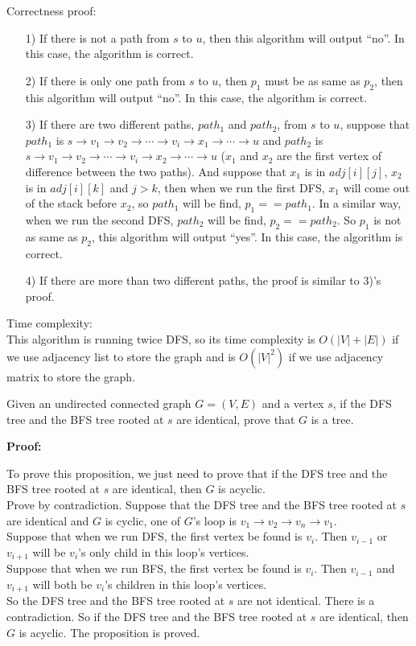 \documentclass{oxmathproblems}
\begin{document}
\begin{questions}
Correctness proof:
\begin{itemize}
	\item [1)] 
	If there is not a path from $s$ to $u$, then this algorithm will output ``no''. In this case, the algorithm is correct.
	\item [2)]
	If there is only one path from $s$ to $u$, then $p_1$ must be as same as $p_2$, then this algorithm will output ``no''. In this case, the algorithm is correct.
	\item [3)]
	If there are two different paths, $path_1$ and $path_2$, from $s$ to $u$, suppose that $path_1$ is $s\rightarrow v_1\rightarrow v_2\rightarrow \cdots \rightarrow v_i\rightarrow x_1\rightarrow \cdots \rightarrow u$ and $path_2$ is $s\rightarrow v_1\rightarrow v_2\rightarrow \cdots \rightarrow v_i\rightarrow x_2\rightarrow \cdots \rightarrow u$ ($x_1$ and $x_2$ are the first vertex of difference between the two paths). And suppose that $x_1$ is in $adj[i][j]$, $x_2$ is in $adj[i][k]$ and $j > k$, then when we run the first DFS, $x_1$ will come out of the stack before $x_2$, so $path_1$ will be find, $p_1 == path_1$. In a similar way, when we run the second DFS, $path_2$ will be find, $p_2 == path_2$. So $p_1$ is not as same as $p_2$, this algorithm will output ``yes''. In this case, the algorithm is correct.
	\item[4)]
	If there are more than two different paths, the proof is similar to 3)'s proof.
\end{itemize}
Time complexity:\\
This algorithm is running twice DFS, so its time complexity is $O(|V|+|E|)$ if we use adjacency list to store the graph and is $O(|V|^2)$ if we use adjacency matrix to store the graph.

\miquestion[25]
Given an undirected connected graph $G=(V,E)$ and a vertex $s$, if the DFS tree and the BFS tree rooted at $s$ are identical, prove that $G$ is a tree.

\textbf{Proof:}

To prove this proposition, we just need to prove that if the DFS tree and the BFS tree rooted at $s$ are identical, then $G$ is acyclic.\\
Prove by contradiction. Suppose that the DFS tree and the BFS tree rooted at $s$ are identical and $G$ is cyclic, one of $G$'s loop is $v_1\rightarrow v_2\rightarrow v_n\rightarrow v_1$.\\
Suppose that when we run DFS, the first vertex be found is $v_i$. Then $v_{i-1}$ or $v_{i+1}$ will be $v_i$'s only child in this loop's vertices.\\
Suppose that when we run BFS, the first vertex be found is $v_i$. Then $v_{i-1}$ and $v_{i+1}$ will both be $v_i$'s children in this loop's vertices.\\
So the DFS tree and the BFS tree rooted at $s$ are not identical. There is a contradiction. So if the DFS tree and the BFS tree rooted at $s$ are identical, then $G$ is acyclic. The proposition is proved.


\end{questions}
\end{document}
